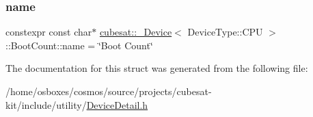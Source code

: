 \subsubsection{\texorpdfstring{name}{name}}
{\footnotesize\ttfamily constexpr const char$\ast$ \hyperlink{structcubesat_1_1__Device}{cubesat\+::\+\_\+\+Device}$<$ Device\+Type\+::\+C\+PU $>$\+::Boot\+Count\+::name = \char`\"{}Boot Count\char`\"{}\hspace{0.3cm}{\ttfamily [static]}}



The documentation for this struct was generated from the following file\+:\begin{DoxyCompactItemize}
\item 
/home/osboxes/cosmos/source/projects/cubesat-\/kit/include/utility/\hyperlink{DeviceDetail_8h}{Device\+Detail.\+h}\end{DoxyCompactItemize}

